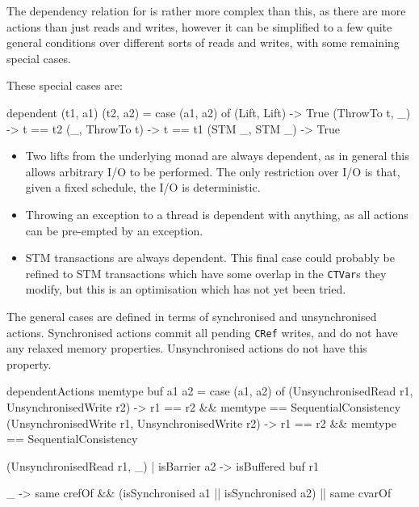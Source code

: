 The dependency relation for \dejafu{} is rather more complex than
this, as there are more actions than just reads and writes, however it
can be simplified to a few quite general conditions over different
sorts of reads and writes, with some remaining special cases.

These special cases are:

\begin{haskellcode}
dependent (t1, a1) (t2, a2) = case (a1, a2) of
  (Lift, Lift)   -> True
  (ThrowTo t, _) -> t == t2
  (_, ThrowTo t) -> t == t1
  (STM _, STM _) -> True
\end{haskellcode}

\begin{itemize}
\item Two lifts from the underlying monad are always dependent, as in
  general this allows arbitrary I/O to be performed. The only
  restriction over I/O is that, given a fixed schedule, the I/O is
  deterministic.

\item Throwing an exception to a thread is dependent with anything, as
  all actions can be pre-empted by an exception.

\item STM transactions are always dependent. This final case could
  probably be refined to STM transactions which have some overlap in
  the \verb|CTVar|s they modify, but this is an optimisation which has
  not yet been tried.
\end{itemize}

The general cases are defined in terms of synchronised and
unsynchronised actions. Synchronised actions commit all pending
\verb|CRef| writes, and do not have any relaxed memory
properties. Unsynchronised actions do not have this property.

\begin{haskellcode}
dependentActions memtype buf a1 a2 = case (a1, a2) of
  (UnsynchronisedRead  r1, UnsynchronisedWrite r2)
    -> r1 == r2 && memtype == SequentialConsistency
  (UnsynchronisedWrite r1, UnsynchronisedWrite r2)
    -> r1 == r2 && memtype == SequentialConsistency

  (UnsynchronisedRead r1, _)
    | isBarrier a2 -> isBuffered buf r1

  _ ->
    same crefOf && (isSynchronised a1 || isSynchronised a2)
    || same cvarOf
\end{haskellcode}

